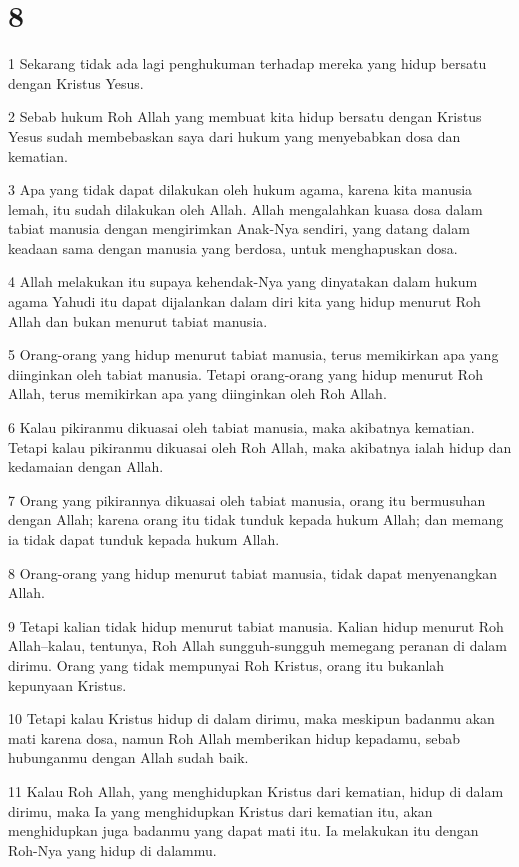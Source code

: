 \chapter{8}

\par 1 Sekarang tidak ada lagi penghukuman terhadap mereka yang hidup bersatu dengan Kristus Yesus.
\par 2 Sebab hukum Roh Allah yang membuat kita hidup bersatu dengan Kristus Yesus sudah membebaskan saya dari hukum yang menyebabkan dosa dan kematian.
\par 3 Apa yang tidak dapat dilakukan oleh hukum agama, karena kita manusia lemah, itu sudah dilakukan oleh Allah. Allah mengalahkan kuasa dosa dalam tabiat manusia dengan mengirimkan Anak-Nya sendiri, yang datang dalam keadaan sama dengan manusia yang berdosa, untuk menghapuskan dosa.
\par 4 Allah melakukan itu supaya kehendak-Nya yang dinyatakan dalam hukum agama Yahudi itu dapat dijalankan dalam diri kita yang hidup menurut Roh Allah dan bukan menurut tabiat manusia.
\par 5 Orang-orang yang hidup menurut tabiat manusia, terus memikirkan apa yang diinginkan oleh tabiat manusia. Tetapi orang-orang yang hidup menurut Roh Allah, terus memikirkan apa yang diinginkan oleh Roh Allah.
\par 6 Kalau pikiranmu dikuasai oleh tabiat manusia, maka akibatnya kematian. Tetapi kalau pikiranmu dikuasai oleh Roh Allah, maka akibatnya ialah hidup dan kedamaian dengan Allah.
\par 7 Orang yang pikirannya dikuasai oleh tabiat manusia, orang itu bermusuhan dengan Allah; karena orang itu tidak tunduk kepada hukum Allah; dan memang ia tidak dapat tunduk kepada hukum Allah.
\par 8 Orang-orang yang hidup menurut tabiat manusia, tidak dapat menyenangkan Allah.
\par 9 Tetapi kalian tidak hidup menurut tabiat manusia. Kalian hidup menurut Roh Allah--kalau, tentunya, Roh Allah sungguh-sungguh memegang peranan di dalam dirimu. Orang yang tidak mempunyai Roh Kristus, orang itu bukanlah kepunyaan Kristus.
\par 10 Tetapi kalau Kristus hidup di dalam dirimu, maka meskipun badanmu akan mati karena dosa, namun Roh Allah memberikan hidup kepadamu, sebab hubunganmu dengan Allah sudah baik.
\par 11 Kalau Roh Allah, yang menghidupkan Kristus dari kematian, hidup di dalam dirimu, maka Ia yang menghidupkan Kristus dari kematian itu, akan menghidupkan juga badanmu yang dapat mati itu. Ia melakukan itu dengan Roh-Nya yang hidup di dalammu.

